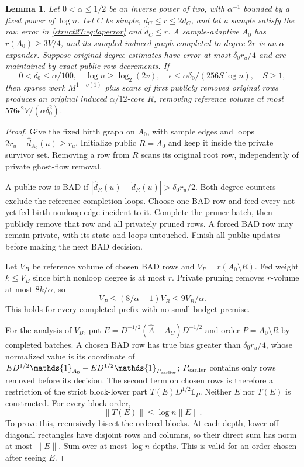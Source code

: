 \documentclass[11pt]{article}
\newtheorem{lemma}[theorem]{Lemma}
\theoremstyle{remark}
\newcommand{\norm}[1]{\lVert#1\rVert}
\newcommand{\oone}{\mathds{1}}
\begin{document}
\begin{lemma}\label{struct27:lem:repair}
Let $0<\alpha\le1/2$ be an inverse power of two, with $\alpha^{-1}$ bounded by a
fixed power of $\log n$.
Let $C$ be simple, $d_C\le r\le2d_C$, and let a sample satisfy the raw error in
\eqref{struct27:eq:laperror} and $\widehat d_C\le r$.
A sample-adaptive $A_0$ has $r(A_0)\ge3V/4$, and its sampled induced graph
completed to degree $2r$ is an $\alpha$-expander.
Suppose original degree estimates have error at most $\delta_0r_u/4$ and are
maintained by exact public row decrements.
If
\[
 0<\delta_0\le\alpha/100,\quad \log n\ge \log_2(2v) ,\quad
 \epsilon\le\alpha\delta_0/(256S\log n),\quad S\ge1,
\]
then sparse work $M^{1+o(1)}$ plus scans of first publicly removed original rows
produces an original induced $\alpha/12$-core $R$, removing reference volume at
most $576\epsilon^2V/(\alpha\delta_0^2)$.
\end{lemma} \begin{proof} Give  the fixed birth
graph on $A_0$, with sample edges and loops $2r_u-\widehat d_{A_0}(u)\ge r_u$.
Initialize public $R=A_0$ and keep it inside the private survivor set.
Removing a row from $R$ scans its original root row, independently of private
ghost-flow removal.

A public row is BAD if $|\widehat d_R(u)-\widetilde d_R(u)|>\delta_0r_u/2$.
Both degree counters exclude the reference-completion loops.
Choose one BAD row and feed every not-yet-fed birth nonloop edge incident to it.
Complete the pruner batch, then publicly remove that row and all privately
pruned rows.
A forced BAD row may remain private, with its state and loops untouched.
Finish all public updates before making the next BAD decision.

Let $V_B$ be reference volume of chosen BAD rows and $V_P=r(A_0\setminus R)$.
Fed weight $k\le V_B$ since birth nonloop degree is at most $r$.
Private pruning removes $r$-volume at most $8k/\alpha$, so
\begin{equation}\label{struct27:eq:repairvp}
 V_P\le(8/\alpha+1)V_B\le9V_B/\alpha.
\end{equation}
This holds for every completed prefix with no small-budget premise.

For the analysis of $V_B$, put $E=D^{-1/2}(\widehat A-A_C)D^{-1/2}$ and order
$P=A_0\setminus R$ by completed batches.
A chosen BAD row has true bias greater than $\delta_0r_u/4$, whose normalized
value is its coordinate of $ED^{1/2}\oone_{A_0}-ED^{1/2}\oone_{P_{\rm
earlier}}$; $P_{\rm earlier}$ contains only rows removed before its decision.
The second term on chosen rows is therefore a restriction of the strict
block-lower part $T(E)D^{1/2}\oone_P$.
Neither $E$ nor $T(E)$ is constructed.
For every block order,
\begin{equation}\label{struct27:eq:triangular}
 \norm{T(E)}\le \log n\norm{E}.
\end{equation}
To prove this, recursively bisect the ordered blocks.
At each depth, lower off-diagonal rectangles have disjoint rows and columns, so
their direct sum has norm at most $\norm{E}$.
Sum over at most $\log n$ depths.
This is valid for an order chosen after seeing $E$.


\end{proof}
\end{document}
